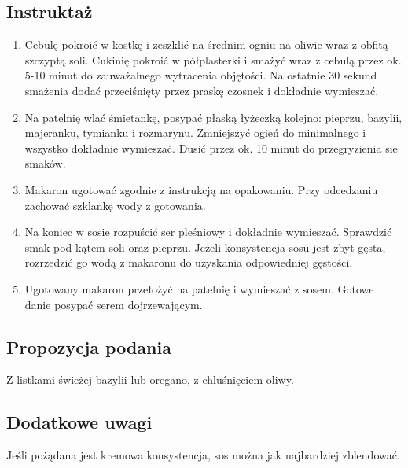 \subsection*{Instruktaż}
\begin{enumerate}
    \item Cebulę pokroić w kostkę i zeszklić na średnim ogniu na oliwie wraz z obfitą szczyptą soli. Cukinię pokroić w półplasterki i smażyć wraz z cebulą przez ok. 5-10 minut do zauważalnego wytracenia objętości. Na ostatnie 30 sekund smażenia dodać przeciśnięty przez praskę czosnek i dokładnie wymieszać.
    \item Na patelnię wlać śmietankę, posypać płaską łyżeczką kolejno: pieprzu, bazylii, majeranku, tymianku i rozmarynu. Zmniejszyć ogień do minimalnego i wszystko dokładnie wymieszać. Dusić przez ok. 10 minut do przegryzienia sie smaków.
    \item Makaron ugotować zgodnie z instrukcją na opakowaniu. Przy odcedzaniu zachować szklankę wody z gotowania.
    \item Na koniec w sosie rozpuścić ser pleśniowy i dokładnie wymieszać. Sprawdzić smak pod kątem soli oraz pieprzu. Jeżeli konsystencja sosu jest zbyt gęsta, rozrzedzić go wodą z makaronu do uzyskania odpowiedniej gęstości.
    \item Ugotowany makaron przełożyć na patelnię i wymieszać z sosem. Gotowe danie posypać serem dojrzewającym.
\end{enumerate}

\vspace{0.5cm}

\small
\subsection*{Propozycja podania}
Z listkami świeżej bazylii lub oregano, z chluśnięciem oliwy.

\vspace{0.3cm}

\subsection*{Dodatkowe uwagi}
Jeśli pożądana jest kremowa konsystencja, sos można jak najbardziej zblendować.
